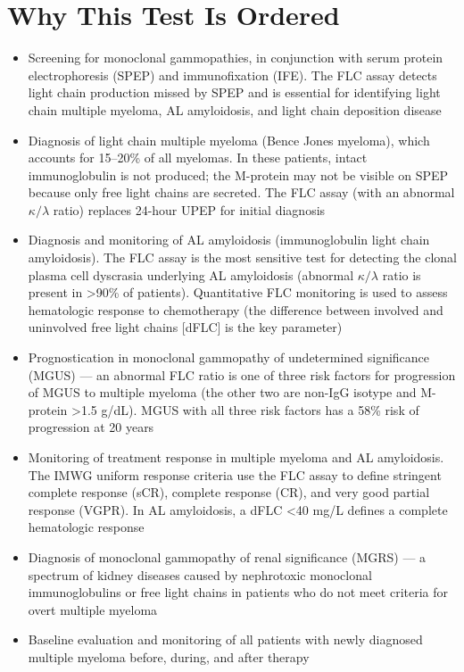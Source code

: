 \section*{Why This Test Is Ordered}
\begin{itemize}
  \item Screening for monoclonal gammopathies, in conjunction with serum protein electrophoresis (SPEP) and immunofixation (IFE). The FLC assay detects light chain production missed by SPEP and is essential for identifying light chain multiple myeloma, AL amyloidosis, and light chain deposition disease
  \item Diagnosis of light chain multiple myeloma (Bence Jones myeloma), which accounts for 15--20\% of all myelomas. In these patients, intact immunoglobulin is not produced; the M-protein may not be visible on SPEP because only free light chains are secreted. The FLC assay (with an abnormal $\kappa/\lambda$ ratio) replaces 24-hour UPEP for initial diagnosis
  \item Diagnosis and monitoring of AL amyloidosis (immunoglobulin light chain amyloidosis). The FLC assay is the most sensitive test for detecting the clonal plasma cell dyscrasia underlying AL amyloidosis (abnormal $\kappa/\lambda$ ratio is present in >90\% of patients). Quantitative FLC monitoring is used to assess hematologic response to chemotherapy (the difference between involved and uninvolved free light chains [dFLC] is the key parameter)
  \item Prognostication in monoclonal gammopathy of undetermined significance (MGUS) --- an abnormal FLC ratio is one of three risk factors for progression of MGUS to multiple myeloma (the other two are non-IgG isotype and M-protein >1.5 g/dL). MGUS with all three risk factors has a 58\% risk of progression at 20 years
  \item Monitoring of treatment response in multiple myeloma and AL amyloidosis. The IMWG uniform response criteria use the FLC assay to define stringent complete response (sCR), complete response (CR), and very good partial response (VGPR). In AL amyloidosis, a dFLC <40 mg/L defines a complete hematologic response
  \item Diagnosis of monoclonal gammopathy of renal significance (MGRS) --- a spectrum of kidney diseases caused by nephrotoxic monoclonal immunoglobulins or free light chains in patients who do not meet criteria for overt multiple myeloma
  \item Baseline evaluation and monitoring of all patients with newly diagnosed multiple myeloma before, during, and after therapy
\end{itemize}

